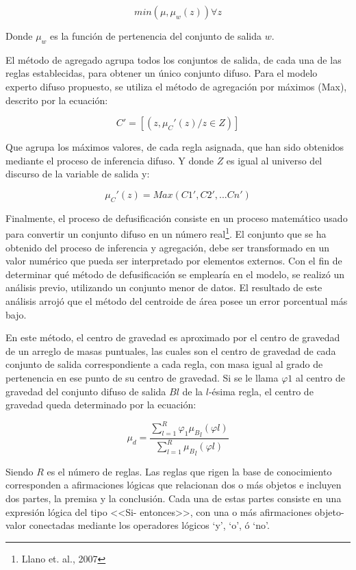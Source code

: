 \documentclass[a4paper, 11pt, titlepage]{article}
\begin{document}
        \[
            min(\mu, \mu_w(z)) \forall z    
        \]

        Donde $\mu_w$ es la función de pertenencia del conjunto de salida $w$.

        El método de agregado agrupa todos los conjuntos de salida, de cada una de las reglas establecidas, 
        para obtener un único conjunto difuso. Para el modelo experto difuso propuesto, se utiliza el método 
        de agregación por máximos (Max), descrito por la ecuación:
        
        \[
            C' = [(z, \mu_C' (z) / z \in Z)]    
        \]

        Que agrupa los máximos valores, de cada regla asignada, que han sido obtenidos mediante el proceso 
        de inferencia difuso. Y donde $Z$ es igual al universo del discurso de la variable de salida y:
        
        \[
            \mu_C' (z) = Max(C1', C2',... Cn')    
        \]

        Finalmente, el proceso de defusificación consiste en un proceso matemático usado para convertir 
        un conjunto difuso en un número real\footnote{
            Llano et. al., 2007
        }. El conjunto que se ha obtenido del proceso de inferencia y agregación, debe ser transformado 
        en un valor numérico que pueda ser interpretado por elementos externos. Con el fin de determinar 
        qué método de defusificación se emplearía en el modelo, se realizó un análisis previo, utilizando
        un conjunto menor de datos. El resultado de este análisis arrojó que el método del centroide de 
        área posee un error porcentual más bajo.

        En este método, el centro de gravedad es aproximado por el centro de gravedad de un arreglo de 
        masas puntuales, las cuales son el centro de gravedad de cada conjunto de salida correspondiente 
        a cada regla, con masa igual al grado de pertenencia en ese punto de su centro de gravedad. Si 
        se le llama $\varphi 1$ al centro de gravedad del conjunto difuso de salida $Bl$ de la $l$-ésima regla, el 
        centro de gravedad queda determinado por la ecuación:

        \[
            \mu_d=\frac{\displaystyle\sum_{l=1}^{R} \varphi_1 {{\mu_B}_l(\varphi l)}}{\displaystyle\sum_{l=1}^{R}{{\mu_B}_l(\varphi l)}}
        \]

        Siendo $R$ es el número de reglas. Las reglas que rigen la base de conocimiento corresponden a 
        afirmaciones lógicas que relacionan dos o más objetos e incluyen dos partes, la premisa y la 
        conclusión. Cada una de estas partes consiste en una expresión lógica del tipo <<Si- entonces>>, 
        con una o más afirmaciones objeto-valor conectadas mediante los operadores lógicos ‘y’, ‘o’, ó 
        ‘no’. 
\end{document}
